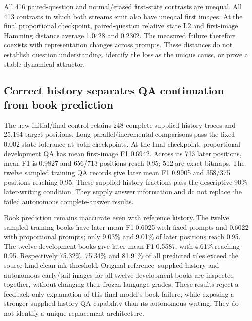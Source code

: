 All 416 paired-question and normal/erased first-state contrasts are unequal.
All 413 contrasts in which both streams emit also have unequal first images.
At the final proportional checkpoint, paired-question relative state L2 and
first-image Hamming distance average 1.0428 and 0.2302. The measured failure
therefore coexists with representation changes across prompts. These distances
do not establish question understanding, identify the loss as the unique cause,
or prove a stable dynamical attractor.

\subsection*{Correct history separates QA continuation from book prediction}
The new initial/final control retains 248 complete supplied-history traces and
25,194 target positions. Long parallel/incremental comparisons pass the fixed
0.002 state tolerance at both checkpoints. At the final checkpoint, proportional
development QA has mean first-image F1 0.6942. Across its 713 later positions,
mean F1 is 0.9827 and 656/713 positions reach 0.95; 512 are exact bitmaps.
The twelve sampled training QA records give later mean F1 0.9905 and 358/375
positions reaching 0.95. These supplied-history fractions pass the descriptive
90\% later-writing condition. They supply answer information and do not
replace the failed autonomous complete-answer results.

Book prediction remains inaccurate even with reference history. The twelve
sampled training books have later mean F1 0.6025 with fixed prompts and 0.6022
with proportional prompts; only 9.03\% and 9.01\% of later positions reach
0.95. The twelve development books give later mean F1 0.5587, with 4.61\%
reaching 0.95. Respectively 75.32\%, 75.34\% and 81.91\% of all predicted
tiles exceed the source-kind clean-ink threshold. Original reference,
supplied-history and autonomous early/tail images for all twelve development
books are inspected together, without changing their frozen language grades.
These results reject a feedback-only explanation of this final model's book
failure, while exposing a stronger supplied-history QA capability than its
autonomous writing. They do not identify a unique replacement architecture.
